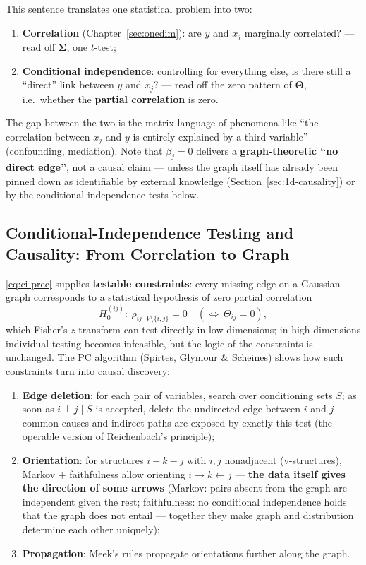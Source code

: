 This sentence translates one statistical problem into two:
\begin{enumerate}[label=(\arabic*)]
  \item \textbf{Correlation} (Chapter~\ref{sec:onedim}): are $y$ and $x_j$ marginally correlated? — read off $\bm{\Sigma}$, one $t$-test;
  \item \textbf{Conditional independence}: controlling for everything else, is there still a ``direct'' link between $y$ and $x_j$? — read off the zero pattern of $\bm{\Theta}$, i.e.\ whether the \textbf{partial correlation} is zero.
\end{enumerate}
The gap between the two is the matrix language of phenomena like ``the correlation between $x_j$ and $y$ is entirely explained by a third variable'' (confounding, mediation). Note that $\beta_j = 0$ delivers a \textbf{graph-theoretic ``no direct edge''}, not a causal claim — unless the graph itself has already been pinned down as identifiable by external knowledge (Section~\ref{sec:1d-causality}) or by the conditional-independence tests below.

\subsection{Conditional-Independence Testing and Causality: From Correlation to Graph}\label{sec:ci-causal}

\eqref{eq:ci-prec} supplies \textbf{testable constraints}: every missing edge on a Gaussian graph corresponds to a statistical hypothesis of zero partial correlation
\begin{equation}\label{eq:ci-test}
  H_0^{(ij)}:\ \rho_{ij\cdot V\setminus\{i,j\}} = 0
  \quad(\Longleftrightarrow\ \Theta_{ij} = 0),
\end{equation}
which Fisher's $z$-transform can test directly in low dimensions; in high dimensions individual testing becomes infeasible, but the logic of the constraints is unchanged. The PC algorithm (Spirtes, Glymour \& Scheines) shows how such constraints turn into causal discovery\cite{spirtes2000}:

\begin{enumerate}[label=(\alph*)]
  \item \textbf{Edge deletion}: for each pair of variables, search over conditioning sets $S$; as soon as $i \perp j \mid S$ is accepted, delete the undirected edge between $i$ and $j$ — common causes and indirect paths are exposed by exactly this test (the operable version of Reichenbach's principle\cite{reichenbach1956});
  \item \textbf{Orientation}: for structures $i - k - j$ with $i, j$ nonadjacent (v-structures), Markov $+$ faithfulness allow orienting $i \to k \leftarrow j$ — \textbf{the data itself gives the direction of some arrows} (Markov: pairs absent from the graph are independent given the rest; faithfulness: no conditional independence holds that the graph does not entail --- together they make graph and distribution determine each other uniquely);
  \item \textbf{Propagation}: Meek's rules propagate orientations further along the graph.
\end{enumerate}


